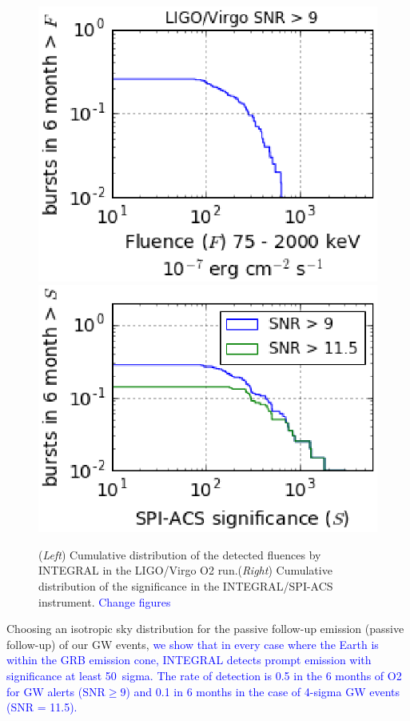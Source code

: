 \documentclass[11pt]{article}
\begin{document}
\begin{figure}
	\centering
    \includegraphics[scale=.6]{P7-1_f4.eps}
    \includegraphics[scale=.6]{P7-1_f5.eps}
    \caption{(\textit{Left}) Cumulative distribution of the
      detected fluences by INTEGRAL in the LIGO/Virgo O2
      run.(\textit{Right}) Cumulative distribution of the significance
      in the INTEGRAL/SPI-ACS instrument. \textcolor{blue}{Change figures}}
    \label{fluence_significance}
\end{figure}

Choosing an isotropic sky distribution for the passive follow-up emission (passive follow-up) 
of our GW events, \textcolor{blue}{we show that
in every case where the Earth is within the GRB emission cone,
INTEGRAL detects prompt emission with significance at least 50~sigma.
The rate of detection is 0.5 in the 6 months of O2 for GW alerts ($\mathrm{SNR} \geq 9$) 
and 0.1 in 6 months  in the case of 4-sigma GW events (SNR = 11.5).} \\
\end{document}
